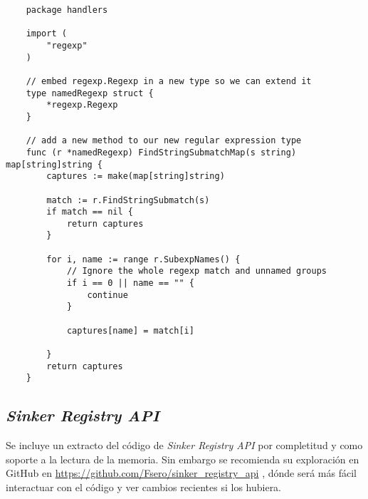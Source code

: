 
\begin{verbatim}
    package handlers
    
    import (
        "regexp"
    )
    
    // embed regexp.Regexp in a new type so we can extend it
    type namedRegexp struct {
        *regexp.Regexp
    }
    
    // add a new method to our new regular expression type
    func (r *namedRegexp) FindStringSubmatchMap(s string) map[string]string {
        captures := make(map[string]string)
    
        match := r.FindStringSubmatch(s)
        if match == nil {
            return captures
        }
    
        for i, name := range r.SubexpNames() {
            // Ignore the whole regexp match and unnamed groups
            if i == 0 || name == "" {
                continue
            }
    
            captures[name] = match[i]
    
        }
        return captures
    }    
\end{verbatim}

\subsection{\emph{Sinker Registry API}}
\label{subsec:sinker-registry-api-src-code}
Se incluye un extracto del código de \emph{Sinker Registry API} por completitud y como soporte a la lectura de la memoria. Sin
embargo se recomienda su exploración en GitHub en \href{https://github.com/Fsero/sinker\_registry\_api}{https://github.com/Fsero/sinker\_registry\_api} , dónde será más fácil interactuar con el código y ver cambios recientes si los 
hubiera.

